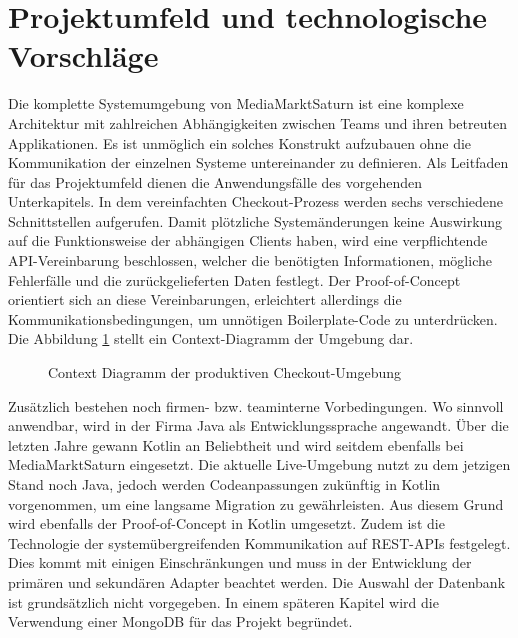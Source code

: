 \section{Projektumfeld und technologische Vorschläge}

Die komplette Systemumgebung von MediaMarktSaturn ist eine komplexe Architektur mit zahlreichen Abhängigkeiten zwischen Teams und ihren betreuten Applikationen. Es ist unmöglich ein solches Konstrukt aufzubauen ohne die Kommunikation der einzelnen Systeme untereinander zu definieren. Als Leitfaden für das Projektumfeld dienen die Anwendungsfälle des vorgehenden Unterkapitels. In dem vereinfachten Checkout-Prozess werden sechs verschiedene Schnittstellen aufgerufen. Damit plötzliche Systemänderungen keine Auswirkung auf die Funktionsweise der abhängigen Clients haben, wird eine verpflichtende API-Vereinbarung beschlossen, welcher die benötigten Informationen, mögliche Fehlerfälle und die zurückgelieferten Daten festlegt. Der Proof-of-Concept orientiert sich an diese Vereinbarungen, erleichtert allerdings die Kommunikationsbedingungen, um unnötigen \Gls{Boilerplate-Code} zu unterdrücken. Die Abbildung \ref{fig:ContextDiagramm} stellt ein Context-Diagramm der Umgebung dar.

\begin{figure}[htbp]
	\centering
	
	\caption{Context Diagramm der produktiven Checkout-Umgebung}
	\label{fig:ContextDiagramm}
\end{figure}

Zusätzlich bestehen noch firmen- bzw. teaminterne Vorbedingungen. Wo sinnvoll anwendbar, wird in der Firma Java als Entwicklungssprache angewandt. Über die letzten Jahre gewann Kotlin an Beliebtheit und wird seitdem ebenfalls bei MediaMarktSaturn eingesetzt. Die aktuelle Live-Umgebung nutzt zu dem jetzigen Stand noch Java, jedoch werden Codeanpassungen zukünftig in Kotlin vorgenommen, um eine langsame Migration zu gewährleisten. Aus diesem Grund wird ebenfalls der Proof-of-Concept in Kotlin umgesetzt. Zudem ist die Technologie der systemübergreifenden Kommunikation auf REST-APIs festgelegt. Dies kommt mit einigen Einschränkungen und muss in der Entwicklung der primären und sekundären Adapter beachtet werden. Die Auswahl der Datenbank ist grundsätzlich nicht vorgegeben. In einem späteren Kapitel wird die Verwendung einer MongoDB für das Projekt begründet.
